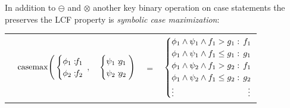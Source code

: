 \documentclass[letterpaper]{article}
\newcommand{\casemax}{\mathrm{casemax}}
\begin{document}
In addition to $\ominus$ and $\otimes$ another key binary operation on case
statements the preserves the LCF property is \emph{symbolic case maximization}:
\vspace{-7mm}
{\footnotesize
\begin{center}
\begin{tabular}{r c c c l}
&
\hspace{-7mm} $\casemax \Bigg(
  \begin{cases}
    \phi_1: \hspace{-2mm} & \hspace{-2mm} f_1 \\ 
    \phi_2: \hspace{-2mm} & \hspace{-2mm} f_2 \\ 
  \end{cases}$
$,$
&
\hspace{-4mm}
  $\begin{cases}
    \psi_1: \hspace{-2mm} & \hspace{-2mm} g_1 \\ 
    \psi_2: \hspace{-2mm} & \hspace{-2mm} g_2 \\ 
  \end{cases} \Bigg)$
&
\hspace{-4mm} 
$ = $
&
\hspace{-4mm}
  $\begin{cases}
  \phi_1 \wedge \psi_1 \wedge f_1 > g_1    : & \hspace{-2mm} f_1 \\ 
  \phi_1 \wedge \psi_1 \wedge f_1 \leq g_1 : & \hspace{-2mm} g_1 \\ 
  \phi_1 \wedge \psi_2 \wedge f_1 > g_2    : & \hspace{-2mm}f_1 \\ 
  \phi_1 \wedge \psi_2 \wedge f_1 \leq g_2 : & \hspace{-2mm} g_2 \\ 
 \vdots & \vdots
  \end{cases}$
\end{tabular}
\end{center}
} \vspace{-1mm}
\end{document}
